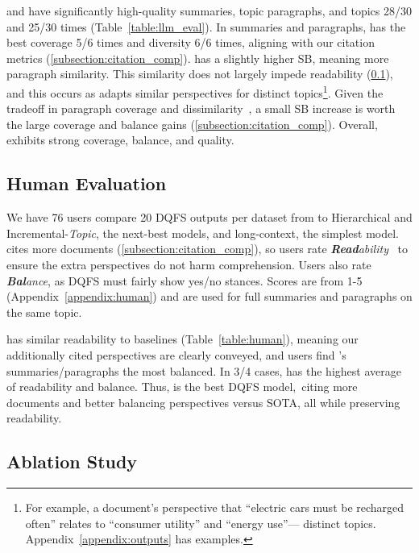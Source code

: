\modelTopic and \modelAll have significantly high-quality summaries, topic paragraphs, and topics 28/30 and 25/30 times (Table~\ref{table:llm_eval}).
In summaries and paragraphs, \model has the best coverage 5/6 times and diversity 6/6 times, aligning with our citation metrics (\cref{subsection:citation_comp}).
\model has a slightly higher SB, meaning more paragraph similarity.
This similarity does not largely impede readability (\cref{subsection:human_eval}), and this occurs as \model adapts similar perspectives for distinct topics\footnote{For example, a document's perspective that ``electric cars must be recharged often'' relates to ``consumer utility'' and ``energy use''--- distinct topics. Appendix~\ref{appendix:outputs} has examples.}.
Given the tradeoff in paragraph coverage and dissimilarity~\cite{alguliev2012gendocsum+}, a small SB increase is worth the large coverage and balance gains (\cref{subsection:citation_comp}).
Overall, \model exhibits strong coverage, balance, and quality.



\subsection{Human Evaluation} \label{subsection:human_eval} 

We have 76 users compare 20 DQFS outputs per dataset from \modelTopic to Hierarchical and Incremental-\textit{Topic}, the next-best models, and long-context, the simplest model.
\model cites more documents (\cref{subsection:citation_comp}), so users rate \textit{\textbf{Read}ability}~\cite{ribeiro2023generating} to ensure the extra perspectives do not harm comprehension.
Users also rate \textit{\textbf{Bal}ance}, as DQFS must fairly show yes/no stances. Scores are from 1-5 (Appendix~\ref{appendix:human}) and are used for full summaries and paragraphs on the same topic.



\model has similar readability to baselines (Table~\ref{table:human}), meaning our additionally cited perspectives are clearly conveyed, and users find \model's summaries/paragraphs the most balanced.
In 3/4 cases, \model has the highest average of readability and balance.
Thus, \model is the best DQFS model,~citing more documents and better balancing perspectives versus SOTA, all while preserving readability.




\subsection{Ablation Study} \label{subsection:ablation}

